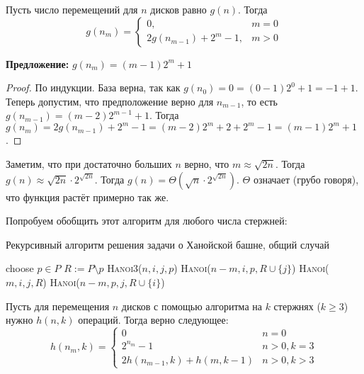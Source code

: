 Пусть число перемещений для $n$ дисков равно $g(n)$. Тогда
\[g(n_m) = \begin{cases}
    0,&m = 0\\
    2g(n_{m-1}) + 2^m - 1,&m > 0
\end{cases}\]

\textbf{Предложение:} $g(n_m) = (m-1)2^m + 1$
\begin{proof}
По индукции. База верна, так как $g(n_0) = 0 = (0 - 1)2^0 + 1 = - 1 + 1$. Теперь допустим, что предположение верно для $n_{m-1}$, то есть $g(n_{m-1}) = (m-2)2^{m-1} + 1$. Тогда $g(n_m) = 2g(n_{m-1}) + 2^m - 1 = (m - 2)2^m + 2 + 2^m - 1 = (m - 1)2^m + 1$.
\end{proof}

Заметим, что при достаточно больших $n$ верно, что $m \approx \sqrt{2n}$. Тогда $g(n) \approx \sqrt{2n} \cdot 2^{\sqrt{2n}}$. Тогда $g(n) = \Theta(\sqrt{n}\cdot2^{\sqrt{2n}})$. $\Theta$ означает (грубо говоря), что функция растёт примерно так же.

Попробуем обобщить этот алгоритм для любого числа стержней:

\begin{algorithm}
\caption{Рекурсивный алгоритм решения задачи о Ханойской башне, общий случай}
\begin{algorithmic}[1]
\State {}
    \State choose $p \in P$
    \State $R \mathrel{:=} P \setminus p$
        \State \textsc{Hanoi3}($n,i,j,p$)
    \Else
        \State \textsc{Hanoi}($n-m,i,p,R \cup \{j\}$)
        \State \textsc{Hanoi}($m,i,j,R$)
        \State \textsc{Hanoi}($n-m,p,j,R \cup \{i\}$)
    \EndIf
\EndIf
\EndFunction
\end{algorithmic}
\end{algorithm}

Пусть для перемещения $n$ дисков с помощью алгоритма на $k$ стержнях ($k \geq 3$) нужно $h(n,k)$ операций. Тогда верно следующее:
\[h(n_m, k) = \begin{cases}
    0& n=0\\
    2^{n_m}-1& n>0, k=3\\
    2h(n_{m-1}, k) + h(m, k-1)& n > 0, k > 3
\end{cases}\]
